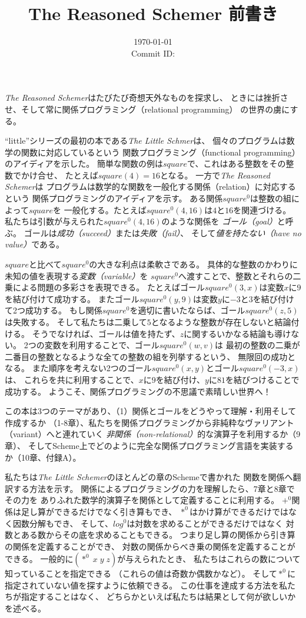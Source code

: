 \documentclass[uplatex, dvipdfmx, ja=standard, a6paper, 9pt]{bxjsarticle}
\date{\today \\
  {\small Commit ID: \GITAbrHash}
}
\title{The Reasoned Schemer 前書き}
\begin{document}
\maketitle

\textit{The Reasoned Schemer}はたびたび奇想天外なものを探求し、
ときには挫折させ、そして常に関係プログラミング（relational programming）
の世界の虜にする。

``little''シリーズの最初の本である\emph{The Little Schmer}は、
個々のプログラムは数学の関数に対応しているという
関数プログラミング（functional programming）のアイディアを示した。
簡単な関数の例は$square$で、これはある整数をその整数でかけ合せ、
たとえば$square(4) = 16$となる。
一方で\emph{The Reasoned Schemer}は
プログラムは数学的な関数を一般化する関係（relation）に対応するという
関係プログラミングのアイディアを示す。
ある関係$square^0$は整数の組によって$square$を
一般化する。たとえば$square^0(4, 16)$は$4$と$16$を関連づける。
私たちは引数が与えられた$square^0(4, 16)$のような関係を
\emph{ゴール（goal）}と呼ぶ。
ゴールは\emph{成功（succeed）}または\emph{失敗（fail）}、
そして\emph{値を持たない（have no value）}である。

$square$と比べて$square^0$の大きな利点は柔軟さである。
具体的な整数のかわりに未知の値を表現する\emph{変数（variable）}を
$square^0$へ渡すことで、整数とそれらの二乗による問題の多彩さを表現できる。
たとえばゴール$square^0(3, x)$は変数$x$に$9$を結び付けて成功する。
またゴール$square^0(y, 9)$は変数$y$に$-3$と$3$を結び付けて2つ成功する。
もし関係$square^0$を適切に書いたならば、ゴール$square^0(z, 5)$は失敗する。
そして私たちは二乗して$5$となるような整数が存在しないと結論付ける。
そうでなければ、ゴールは値を持たず、$z$に関するいかなる結論も導けない。
2つの変数を利用することで、ゴール$square^0(w, v)$は
最初の整数の二乗が二番目の整数となるような全ての整数の組を列挙するという、
無限回の成功となる。
また順序を考えない2つのゴール$square^0(x, y)$とゴール$square^0(-3, x)$は、
これらを共に利用することで、$x$に$9$を結び付け、$y$に$81$を結びつけることで成功する。
ようこそ、関係プログラミングの不思議で素晴しい世界へ！

この本は3つのテーマがあり、（1）関係とゴールをどうやって理解・利用そして作成するか
（1-8章）、私たちを関係プログラミングから非純粋なヴァリアント（variant）へと連れていく
\emph{非関係（non-relational）}的な演算子を利用するか（9章）、
そしてScheme上でどのように完全な関係プログラミング言語を実装するか（10章、付録A）。

私たちは\emph{The Little Schemer}のほとんどの章のSchemeで書かれた
関数を関係へ翻訳する方法を示す。
関係によるプログラミングの力を理解したら、7章と8章でその力を
ありふれた数学的演算子を関係として定義することに利用する。
$+^0$関係は足し算ができるだけでなく引き算もでき、
$*^0$はかけ算ができるだけではなく因数分解もでき、
そして、$log^0$は対数を求めることができるだけではなく
対数とある数からその底を求めることもできる。
つまり足し算の関係から引き算の関係を定義することができ、
対数の関係からべき乗の関係を定義することができる。
一般的に$(*^0\; x\; y\; z)$が与えられたとき、
私たちはこれらの数について知っていることを指定できる
（これらの値は奇数か偶数かなど）。
そして$*^0$に指定されていない値を探すように依頼できる。
この仕事を達成する方法を私たちが指定することはなく、
どちらかといえば私たちは結果として何が欲しいかを述べる。
\end{document}
